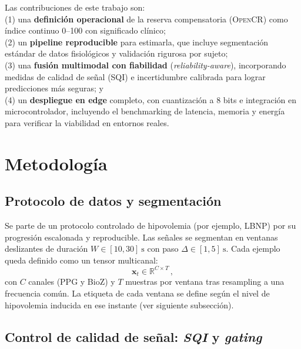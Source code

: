 \documentclass[10pt,a4paper,twocolumn]{article}
\newcommand{\OpenCR}{\textsc{OpenCR}}
\begin{document}
Las contribuciones de este trabajo son:  \\
(1) una \textbf{definici\'on operacional} de la reserva compensatoria (\OpenCR) como \'indice continuo 0--100 con significado cl\'inico;  \\
(2) un \textbf{pipeline reproducible} para estimarla, que incluye segmentaci\'on est\'andar de datos fisiol\'ogicos y validaci\'on rigurosa por sujeto;  \\
(3) una \textbf{fusi\'on multimodal con fiabilidad} (\emph{reliability-aware}), incorporando medidas de calidad de se\~nal (SQI) e incertidumbre calibrada para lograr predicciones m\'as seguras; y  \\
(4) un \textbf{despliegue en edge} completo, con cuantizaci\'on a 8 bits e integraci\'on en microcontrolador, incluyendo el benchmarking de latencia, memoria y energ\'ia para verificar la viabilidad en entornos reales. 
\section{Metodolog\'ia}

\subsection{Protocolo de datos y segmentaci\'on}

Se parte de un protocolo controlado de hipovolemia (por ejemplo, LBNP) por su progresi\'on escalonada y reproducible. Las se\~nales se segmentan en ventanas deslizantes de duraci\'on $W\in[10,30]~\si{\second}$ con paso $\Delta\in[1,5]~\si{\second}$. Cada ejemplo queda definido como un tensor multicanal:
\begin{equation}
\bm{x}_t \in \mathbb{R}^{C\times T}\,,
\end{equation}
con $C$ canales (PPG y BioZ) y $T$ muestras por ventana tras resampling a una frecuencia com\'un. La etiqueta de cada ventana se define seg\'un el nivel de hipovolemia inducida en ese instante (ver siguiente subsecci\'on).

\subsection{Control de calidad de se\~nal: \emph{SQI} y \emph{gating}}
\end{document}
